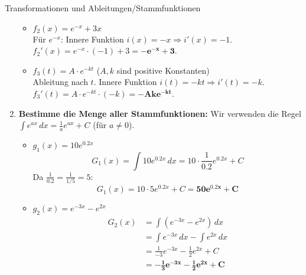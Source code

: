 \begin{loesungsumgebung}{Transformationen und Ableitungen/Stammfunktionen}
\begin{enumerate}[label=(\alph*)]
\begin{itemize}
        \item \textbf{$f_2(x) = e^{-x} + 3x$} \\
        Für $e^{-x}$: Innere Funktion $i(x)=-x \Rightarrow i'(x)=-1$.
        $f_2'(x) = e^{-x} \cdot (-1) + 3 = \mathbf{-e^{-x} + 3}$.

        \item \textbf{$f_3(t) = A \cdot e^{-kt}$} ($A, k$ sind positive Konstanten) \\
        Ableitung nach $t$. Innere Funktion $i(t)=-kt \Rightarrow i'(t)=-k$.
        $f_3'(t) = A \cdot e^{-kt} \cdot (-k) = \mathbf{-Ake^{-kt}}$.
    \end{itemize}

    \item \textbf{Bestimme die Menge aller Stammfunktionen:}
    Wir verwenden die Regel $\int e^{ax} \,dx = \frac{1}{a}e^{ax} + C$ (für $a \neq 0$).
    \begin{itemize}
        \item \textbf{$g_1(x) = 10e^{0.2x}$}
        $$ G_1(x) = \int 10e^{0.2x} \,dx = 10 \cdot \frac{1}{0.2} e^{0.2x} + C $$
        Da $\frac{1}{0.2} = \frac{1}{1/5} = 5$:
        $$ G_1(x) = 10 \cdot 5 e^{0.2x} + C = \mathbf{50e^{0.2x} + C} $$

        \item \textbf{$g_2(x) = e^{-3x} - e^{2x}$}
        \begin{align*} G_2(x) &= \int (e^{-3x} - e^{2x}) \,dx \\ &= \int e^{-3x} \,dx - \int e^{2x} \,dx \\ &= \frac{1}{-3}e^{-3x} - \frac{1}{2}e^{2x} + C \\ &= \mathbf{-\frac{1}{3}e^{-3x} - \frac{1}{2}e^{2x} + C} \end{align*}
    \end{itemize}
\end{enumerate}

\end{loesungsumgebung}



